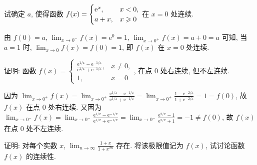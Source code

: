 \begin{exercise}[2.1.7]
    试确定 $a$, 使得函数 $f(x) = \begin{cases} \mathrm{e}^x, & x < 0, \\ a+x, & x \geqslant 0 \end{cases}$ 在 $x=0$ 处连续.
\end{exercise}

\begin{solution}
    由 $f(0) = a$, $\lim_{x \to 0^-} f(x) = \mathrm{e}^0 = 1$, $\lim_{x \to 0^+} f(x) = a + 0 = a$ 可知, 当 $a=1$ 时, $\lim_{x \to 0} f(x) = f(0)=1$, 即 $f(x)$ 在 $x=0$ 处连续.
\end{solution}

\begin{exercise}[2.1.8]
    证明: 函数 $f(x) = \begin{cases} \frac{\mathrm{e}^{1/x}-\mathrm{e}^{-1/x}}{\mathrm{e}^{1/x}+\mathrm{e}^{-1/x}}, & x \ne 0, \\ 1, & x=0 \end{cases}$, 在点 $0$ 处右连续, 但不左连续.
\end{exercise}

\begin{solution}
    因为 $\lim_{x \to 0^+} f(x) = \lim_{x \to 0^+} \frac{\mathrm{e}^{1/x}-\mathrm{e}^{-1/x}}{\mathrm{e}^{1/x}+\mathrm{e}^{-1/x}} = \lim_{x \to 0^+} \frac{1-\mathrm{e}^{-2/x}}{1+\mathrm{e}^{-2/x}} = 1 = f(0)$, 故 $f(x)$ 在点 $0$ 处右连续. 又因为 $\lim_{x \to 0^-} f(x) = \lim_{x \to 0^-} \frac{\mathrm{e}^{1/x}-\mathrm{e}^{-1/x}}{\mathrm{e}^{1/x}+\mathrm{e}^{-1/x}} = \lim_{x \to 0^-} \frac{\mathrm{e}^{2/x}-1}{\mathrm{e}^{2/x}+1} = -1 \ne f(0)$, 故 $f(x)$ 在点 $0$ 处不左连续.
\end{solution}

\begin{exercise}[2.1.9]
    证明: 对每个实数 $x$, $\lim_{n \to \infty} \frac{1+x}{1+x^{2n}}$ 存在. 将该极限值记为 $f(x)$, 试讨论函数 $f(x)$ 的连续性.
\end{exercise}

